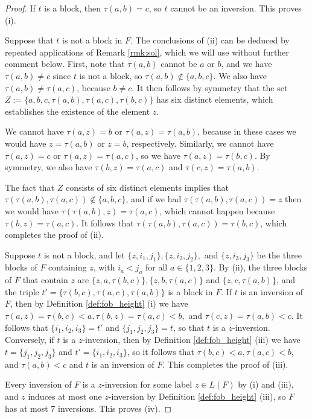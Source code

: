 \documentclass[10pt,a4paper]{amsart}
\numberwithin{equation}{section}
\begin{document}
\begin{proof}  
  If $t$ is a block, then $\tau(a,b)=c$, so $t$ cannot be an
  inversion. This proves (i). 

  Suppose that $t$ is not a block in $F$. The conclusions of (ii) can be deduced
  by repeated applications of Remark \ref{rmk:sol}, which we will use without
  further comment below. First, note that $\tau(a,b)$ cannot be $a$ or $b$, and
  we have $\tau(a,b)\neq c$ since $t$ is not a block, so
  $\tau(a,b)\notin\{a,b,c\}$. We also have $\tau(a,b)\neq \tau(a,c)$, because
  $b\neq c$. It then follows by symmetry that the set
  $Z:=\{a,b,c,\tau(a,b),\tau(a,c), \tau(b,c)\}$ has six distinct elements, which
  establishes the existence of the element $z$. 

  We cannot have $\tau(a,z)=b$ or
  $\tau(a,z)=\tau(a,b)$, because in these cases we would have $z=\tau(a,b)$ or
  $z=b$, respectively. Similarly, we cannot have $\tau(a,z)=c$ or
  $\tau(a,z)=\tau(a,c)$, so we have $\tau(a,z)=\tau(b,c)$. By symmetry, we also
  have $\tau(b,z)=\tau(a,c)$ and $\tau(c,z)=\tau(a,b)$. 

  The fact that $Z$ consists of six distinct elements implies that
  $\tau(\tau(a,b),\tau(a,c))\notin \{a,b,c\}$, and if we had $\tau(\tau(a,b),
  \tau(a,c))=z$ then we would have $\tau(\tau(a,b),z)=\tau(a,c)$, which cannot
  happen because $\tau(b,z)=\tau(a,c)$. It follows that
  $\tau(\tau(a,b),\tau(a,c))=\tau(b,c)$, which completes the proof of (ii).
 
  Suppose $t$ is not a block, and let $\{z,i_1,j_1\}, \{z,i_2,j_2\},$ and
  $\{z,i_3,j_3\}$ be the three blocks of $F$ containing $z$, with $i_a<j_a$ for
  all $a\in \{1,2,3\}$. By (ii), the three blocks of $F$ that contain $z$ are
  $\{z,a,\tau(b,c)\}, \{z,b,\tau(a,c)\}$ and $\{z,c,\tau(a,b)\}$, and the triple
  $t'=\{\tau(b,c),\tau(a,c),\tau(a,b)\}$ is a block in $F$. If $t$ is an
  inversion of $F$, then by Definition \ref{def:fob_height} (i) we have
  $\tau(a,z)=\tau(b,c)<a, \tau(b,z)=\tau(a,c)<b,$ and $\tau(c,z)=\tau(a,b)<c$.
  It follows that $\{i_1,i_2,i_3\}=t'$ and $\{j_1,j_2,j_3\}=t$, so that $t$ is a
  $z$-inversion. Conversely, if $t$ is a $z$-inversion, then by Definition
  \ref{def:fob_height} (iii) we have $t=\{j_1,j_2,j_3\}$ and
  $t'=\{i_1,i_2,i_3\}$, so it follows that $\tau(b,c)<a, \tau(a,c)<b$, and
  $\tau(a,b)<c$ and $t$ is an inversion of $F$. This completes the proof of
  (iii).

  Every inversion of $F$ is a $z$-inversion for some label $z\in L(F)$ by (i)
and (iii), and $z$ induces at most one $z$-inversion by Definition
\ref{def:fob_height} (iii), so $F$ has at most 7 inversions. This proves (iv).
\end{proof}
\end{document}

